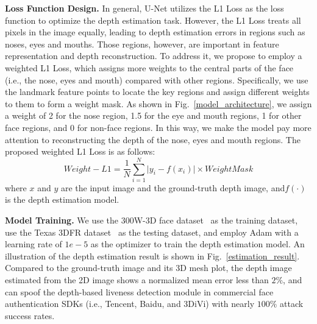 \textbf{Loss Function Design.} In general, U-Net utilizes the L1 Loss as the loss function to optimize the depth estimation task. However, the L1 Loss treats all pixels in the image equally, leading to depth estimation errors in  regions such as  noses, eyes and mouths. Those regions, however, are important in feature representation and depth reconstruction.  To address it, we propose to employ a weighted L1 Loss, which assigns more weights to the central parts of the face (i.e., the nose, eyes and mouth) compared with other regions. Specifically,  we use the landmark feature points to locate the key regions and assign different weights to them to form a weight mask. As shown in Fig.~\ref{model_architecture},  we assign a weight of  2 for the nose region, 1.5 for the eye and mouth regions, 1 for other face regions, and 0 for non-face regions. In this way, we make the model pay more attention to reconstructing the depth of the nose, eyes and mouth regions. 
The proposed weighted L1 Loss is as follows:
\begin{equation}
	Weight{-}L1=\frac{1}{N}\sum_{i=1}^{N} \lvert y_i - f(x_i) \rvert \times WeightMask
	\label{weigted_loss}
\end{equation}
where $x$ and $y$ are the input image and the ground-truth depth image,  and$f(\cdot)$ is the depth estimation model.

\textbf{Model Training.}
We use the 300W-3D face dataset~\cite{zhu2016face} as the training dataset, use the Texas 3DFR dataset~\cite{gupta2010anthropometric, gupta2010texas} as the testing dataset, and employ Adam with a learning rate of $1e{-}5$  as the optimizer to train the depth estimation model.  An illustration of the depth estimation result is shown in Fig.~\ref{estimation_result}. Compared to the ground-truth image and its 3D mesh plot, the depth image estimated from the 2D image shows a normalized mean error less than $2\%$, and can spoof the depth-based liveness detection module in commercial face authentication SDKs (i.e., Tencent, Baidu, and 3DiVi) with nearly $100\%$ attack success rates.


